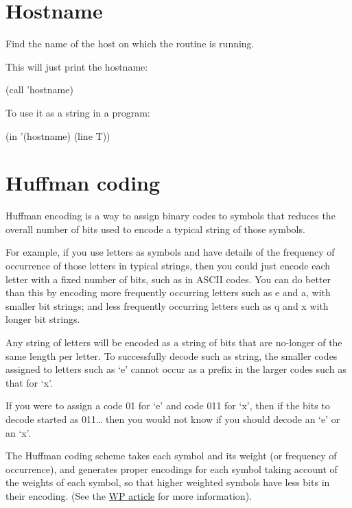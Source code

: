\begin{itemize}
\pagebreak{}
\section*{Hostname}

Find the name of the host on which the routine is running.

\begin{wideverbatim}

This will just print the hostname:

(call 'hostname)

To use it as a string in a program:

(in '(hostname) (line T))

\end{wideverbatim}

\pagebreak{}
\section*{Huffman coding}

Huffman encoding is a way to assign binary codes to symbols that reduces
the overall number of bits used to encode a typical string of those
symbols.

For example, if you use letters as symbols and have details of the
frequency of occurrence of those letters in typical strings, then you
could just encode each letter with a fixed number of bits, such as in
ASCII codes. You can do better than this by encoding more frequently
occurring letters such as e and a, with smaller bit strings; and less
frequently occurring letters such as q and x with longer bit strings.

Any string of letters will be encoded as a string of bits that are
no-longer of the same length per letter. To successfully decode such as
string, the smaller codes assigned to letters such as `e' cannot occur
as a prefix in the larger codes such as that for `x'.

If you were to assign a code 01 for `e' and code 011 for `x', then if
the bits to decode started as 011\ldots{} then you would not know if you
should decode an `e' or an `x'.

The Huffman coding scheme takes each symbol and its weight (or frequency
of occurrence), and generates proper encodings for each symbol taking
account of the weights of each symbol, so that higher weighted symbols
have less bits in their encoding. (See the
\href{http://en.wikipedia.org/wiki/Huffman\_coding}{WP article} for more
information).


\end{itemize}
